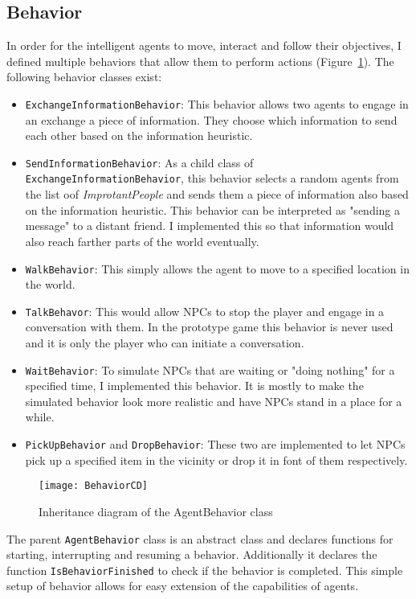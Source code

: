\subsection{Behavior}
In order for the intelligent agents to move, interact and follow their objectives, I defined multiple behaviors that allow them to perform actions (Figure~\ref{fig:behaviorCD}). The following behavior classes exist:
\begin{itemize}
	\item \verb|ExchangeInformationBehavior|: This behavior allows two agents to engage in an exchange a piece of information. They choose which information to send each other based on the information heuristic.
	\item \verb|SendInformationBehavior|: As a child class of \verb|ExchangeInformationBehavior|, this behavior selects a random agents from the list oof \textit{ImprotantPeople} and sends them a piece of information also based on the information heuristic. This behavior can be interpreted as "sending a message" to a distant friend. I implemented this so that information would also reach farther parts of the world eventually.
	\item \verb|WalkBehavior|: This simply allows the agent to move to a specified location in the world.
	\item \verb|TalkBehavor|: This would allow NPCs to stop the player and engage in a conversation with them. In the prototype game this behavior is never used and it is only the player who can initiate a  conversation.
	\item \verb|WaitBehavior|: To simulate NPCs that are waiting or "doing nothing" for a specified time, I implemented this behavior. It is mostly to make the simulated behavior look more realistic and have NPCs stand in a place for a while.
	\item \verb|PickUpBehavior| and \verb|DropBehavior|: These two are implemented to let NPCs pick up a specified item in the vicinity or drop it in font of them respectively.
\end{itemize}
\begin{figure}
	\centering
	\texttt{[image: BehaviorCD]}
	\caption{Inheritance diagram of the AgentBehavior class}
	\label{fig:behaviorCD}
\end{figure}
The parent \verb|AgentBehavior| class is an abstract class and declares functions for starting, interrupting and resuming a behavior. Additionally it declares the function \verb|IsBehaviorFinished| to check if the behavior is completed. This simple setup of behavior allows for easy extension of the capabilities of agents.
